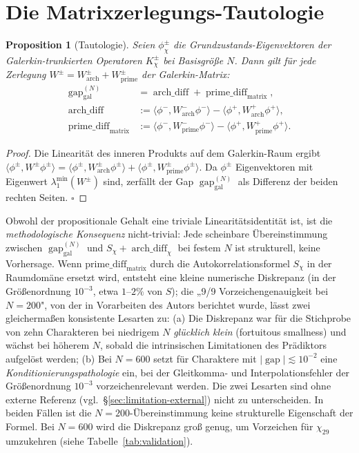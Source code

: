 \documentclass[a4paper,10pt,twocolumn]{article}
\newtheorem{proposition}[theorem]{Proposition}
\theoremstyle{definition}
\theoremstyle{remark}
\newcommand{\gap}{\operatorname{gap}}
\newcommand{\chifn}{\chi}
\newcommand{\archdiff}{\operatorname{arch\_diff}}
\newcommand{\primediff}{\operatorname{prime\_diff}_{\mathrm{matrix}}}
\begin{document}
\section{Die Matrixzerlegungs-Tautologie}
\label{sec:tautology}

\begin{proposition}[Tautologie]
\label{prop:tautology}
Seien $\phi^\pm_{\chifn}$ die Grundzustands-Eigenvektoren der Galerkin-trunkierten
Operatoren $K^\pm_{\chifn}$ bei Basisgröße $N$. Dann gilt für jede Zerlegung
$W^\pm = W^\pm_{\mathrm{arch}} + W^\pm_{\mathrm{prime}}$ der Galerkin-Matrix:
\[
\begin{aligned}
  \gap_{\mathrm{gal}}^{(N)}
    &= \archdiff + \primediff,\\
  \archdiff
    &:= \langle\phi^-, W^-_{\mathrm{arch}}\phi^-\rangle
      - \langle\phi^+, W^+_{\mathrm{arch}}\phi^+\rangle,\\
  \primediff
    &:= \langle\phi^-, W^-_{\mathrm{prime}}\phi^-\rangle
      - \langle\phi^+, W^+_{\mathrm{prime}}\phi^+\rangle.
\end{aligned}
\]
\end{proposition}

\begin{proof}
Die Linearität des inneren Produkts auf dem Galerkin-Raum ergibt
$\langle\phi^\pm, W^\pm\phi^\pm\rangle = \langle\phi^\pm,
W^\pm_{\mathrm{arch}}\phi^\pm\rangle + \langle\phi^\pm,
W^\pm_{\mathrm{prime}}\phi^\pm\rangle$.
Da $\phi^\pm$ Eigenvektoren mit Eigenwert $\lambda_1^{\min}(W^\pm)$ sind,
zerfällt der Gap $\gap_{\mathrm{gal}}^{(N)}$ als Differenz der beiden rechten
Seiten. $\square$
\end{proof}

Obwohl der propositionale Gehalt eine triviale Linearitätsidentität ist, ist
die \emph{methodologische Konsequenz} nicht-trivial: Jede scheinbare
Übereinstimmung zwischen $\gap_{\mathrm{gal}}^{(N)}$ und $S_\chi+\archdiff_\chi$
bei festem $N$ ist strukturell, keine Vorhersage. Wenn
$\mathrm{prime\_diff}_{\mathrm{matrix}}$ durch die Autokorrelationsformel
$S_{\chifn}$ in der Raumdomäne ersetzt wird, entsteht eine kleine numerische Diskrepanz
(in der Größenordnung $10^{-3}$, etwa $1$--$2\%$ von $S$); die „9/9 Vorzeichengenauigkeit bei
$N=200$", von der in Vorarbeiten des Autors berichtet wurde, lässt zwei
gleichermaßen konsistente Lesarten zu: (a) Die Diskrepanz war für die
Stichprobe von zehn Charakteren bei niedrigem $N$ \emph{glücklich klein}
(fortuitous smallness) und wächst bei höherem $N$, sobald die intrinsischen
Limitationen des Prädiktors aufgelöst werden; (b) Bei $N=600$ setzt für
Charaktere mit $|\gap|\lesssim 10^{-2}$ eine
\emph{Konditionierungspathologie} ein, bei der Gleitkomma- und
Interpolationsfehler der Größenordnung $10^{-3}$ vorzeichenrelevant
werden. Die zwei Lesarten sind ohne externe Referenz
(vgl.\ \S\ref{sec:limitation-external}) nicht zu unterscheiden. In
beiden Fällen ist die $N=200$-Übereinstimmung keine strukturelle
Eigenschaft der Formel. Bei $N=600$ wird die Diskrepanz groß genug,
um Vorzeichen für $\chifn_{29}$ umzukehren (siehe Tabelle~\ref{tab:validation}).
\end{document}
